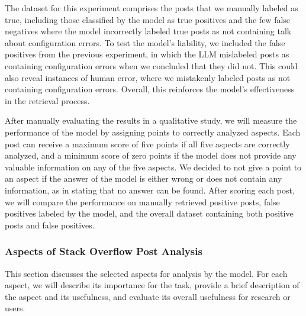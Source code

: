 \documentclass[english,bachelor]{swsLeipzig}
\begin{document}
The dataset for this experiment comprises the posts that we manually labeled as true, including those 
classified by the model as true positives and the few false negatives where the model incorrectly labeled true posts as not containing talk about configuration errors. To test the model's liability, we included the false positives from the previous experiment, in which the LLM mislabeled posts as containing configuration errors when we concluded that they did not. This could also reveal instances of human error, where we mistakenly labeled posts as not containing configuration errors. Overall, this reinforces the model's effectiveness in the retrieval process.

After manually evaluating the results in a qualitative study, we will measure the performance of the 
model by assigning points to correctly analyzed aspects. Each post can receive a maximum score of five points if all five aspects are correctly analyzed, and a minimum score of zero points if the model does not provide any valuable information on any of the five aspects. We decided to not give a point to an aspect if the answer of the model is either wrong or does not contain any information, as in stating that no answer can be found. After scoring each post, we will compare the performance on manually retrieved positive posts, false positives labeled by the model, and the overall dataset containing both positive posts and false positives.

\subsubsection{Aspects of Stack Overflow Post Analysis}

This section discusses the selected aspects for analysis by the model. For each aspect, we will describe 
its importance for the task, provide a brief description of the aspect and its usefulness, and evaluate its overall usefulness for research or users.
\end{document}
